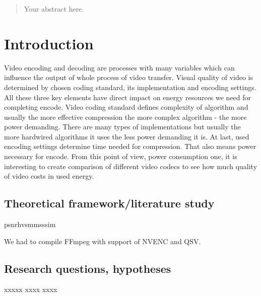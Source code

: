 \documentclass[12pt,twoside]{article}
\begin{document}
\maketitle


\begin{abstract}
\label{sec:abstract}

Your abstract here.

\end{abstract}


\tableofcontents
{}
\printglossary[type=\acronymtype]



\clearpage
\section{Introduction}
\label{sect:introduction}
Video encoding and decoding are processes with many variables which can influence the output of whole process of video transfer. Visual quality of video is determined by chosen coding standard, its implementation and encoding settings. All these three key elements have direct impact on energy resources we need for completing encode. Video coding standard defines complexity of algorithm and usually the more effective compression the more complex algorithm - the more power demanding. There are many types of implementations but usually the more hardwired algorithms it uses the less power demanding it is. At last, used encoding settings determine time needed for compression. That also means power necessary for encode. From this point of view, power consumption one, it is interesting to create comparison of different video codecs to see how much quality of video costs in used energy.


\subsection{Theoretical framework/literature study}
\label{sect:framework}
\acrshort{psnrhvsm}\acrshort{msssim}

We had to compile FFmpeg with support of NVENC and QSV.\cite{intelffmpeg,nvidiaffmpeg}

\subsection{Research questions, hypotheses}
\label{sect:questions}
xxxxx xxxx xxxx 
\end{document}
